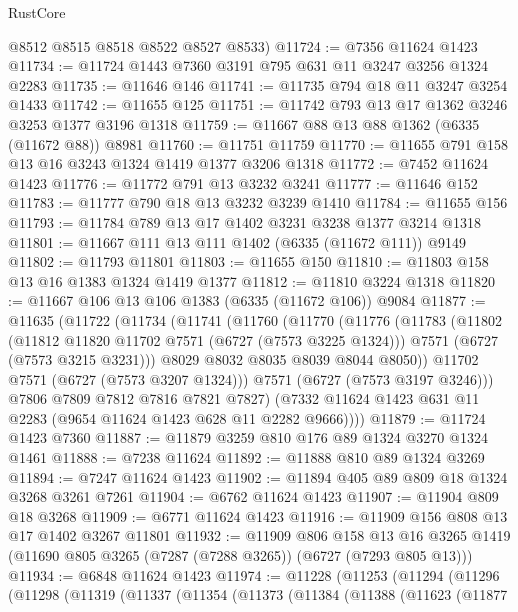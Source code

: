\begin{lexlean}{RustCore}
\begin{coremodule}
      @8512
      @8515
      @8518
      @8522
      @8527
      @8533)
@11724 := @7356 @11624 @1423
@11734 := @11724 @1443 @7360 @3191 @795 @631 @11 @3247 @3256 @1324 @2283
@11735 := @11646 @146
@11741 := @11735 @794 @18 @11 @3247 @3254 @1433
@11742 := @11655 @125
@11751 := @11742 @793 @13 @17 @1362 @3246 @3253 @1377 @3196 @1318
@11759 := @11667 @88 @13 @88 @1362 (@6335 (@11672 @88)) @8981
@11760 := @11751 @11759
@11770 := @11655 @791 @158 @13 @16 @3243 @1324 @1419 @1377 @3206 @1318
@11772 := @7452 @11624 @1423
@11776 := @11772 @791 @13 @3232 @3241
@11777 := @11646 @152
@11783 := @11777 @790 @18 @13 @3232 @3239 @1410
@11784 := @11655 @156
@11793 := @11784 @789 @13 @17 @1402 @3231 @3238 @1377 @3214 @1318
@11801 := @11667 @111 @13 @111 @1402 (@6335 (@11672 @111)) @9149
@11802 := @11793 @11801
@11803 := @11655 @150
@11810 := @11803 @158 @13 @16 @1383 @1324 @1419 @1377
@11812 := @11810 @3224 @1318
@11820 := @11667 @106 @13 @106 @1383 (@6335 (@11672 @106)) @9084
@11877 := @11635
    (@11722
      (@11734
        (@11741
          (@11760
            (@11770
              (@11776
                (@11783
                  (@11802
                    (@11812 @11820 @11702 @7571 (@6727 (@7573 @3225 @1324)))
                    @7571
                    (@6727 (@7573 @3215 @3231)))
                  @8029
                  @8032
                  @8035
                  @8039
                  @8044
                  @8050))
              @11702
              @7571
              (@6727 (@7573 @3207 @1324)))
            @7571
            (@6727 (@7573 @3197 @3246)))
          @7806
          @7809
          @7812
          @7816
          @7821
          @7827)
        (@7332 @11624 @1423 @631 @11 @2283 (@9654 @11624 @1423 @628 @11 @2282 @9666))))
@11879 := @11724 @1423 @7360
@11887 := @11879 @3259 @810 @176 @89 @1324 @3270 @1324 @1461
@11888 := @7238 @11624
@11892 := @11888 @810 @89 @1324 @3269
@11894 := @7247 @11624 @1423
@11902 := @11894 @405 @89 @809 @18 @1324 @3268 @3261 @7261
@11904 := @6762 @11624 @1423
@11907 := @11904 @809 @18 @3268
@11909 := @6771 @11624 @1423
@11916 := @11909 @156 @808 @13 @17 @1402 @3267 @11801
@11932 := @11909
    @806
    @158
    @13
    @16
    @3265
    @1419
    (@11690 @805 @3265 (@7287 (@7288 @3265)) (@6727 (@7293 @805 @13)))
@11934 := @6848 @11624 @1423
@11974 := @11228
    (@11253
      (@11294
        (@11296
          (@11298
            (@11319
              (@11337
                (@11354
                  (@11373
                    (@11384
                      (@11388
                        (@11623
                          (@11877

\end{coremodule}
\end{lexlean}
